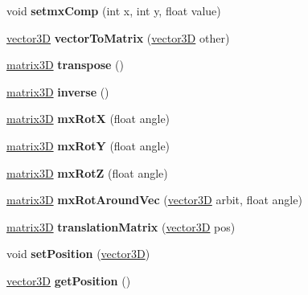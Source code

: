 \begin{DoxyCompactItemize}
\item 
\mbox{\label{classmatrix3_d_a90a56c9b54e69c6e6b14e5253e6fb507}} 
void {\bfseries setmx\+Comp} (int x, int y, float value)
\item 
\mbox{\label{classmatrix3_d_a24c14cd108fbee307eacc640d68af949}} 
\hyperlink{classvector3_d}{vector3D} {\bfseries vector\+To\+Matrix} (\hyperlink{classvector3_d}{vector3D} other)
\item 
\mbox{\label{classmatrix3_d_a3af04aa7b7595c94f41c6ecfb59c39c2}} 
\hyperlink{classmatrix3_d}{matrix3D} {\bfseries transpose} ()
\item 
\mbox{\label{classmatrix3_d_a375ff7e7c3504d98c6a6411744cf4aa1}} 
\hyperlink{classmatrix3_d}{matrix3D} {\bfseries inverse} ()
\item 
\mbox{\label{classmatrix3_d_ae0015f2654b0a8c44fe68c5464d8c8bb}} 
\hyperlink{classmatrix3_d}{matrix3D} {\bfseries mx\+RotX} (float angle)
\item 
\mbox{\label{classmatrix3_d_af59b5122e4f93a592a0a530186e067b0}} 
\hyperlink{classmatrix3_d}{matrix3D} {\bfseries mx\+RotY} (float angle)
\item 
\mbox{\label{classmatrix3_d_a16ad1167b5b54aa4c50b146b51141a28}} 
\hyperlink{classmatrix3_d}{matrix3D} {\bfseries mx\+RotZ} (float angle)
\item 
\mbox{\label{classmatrix3_d_a9dd591470d14ffb310134d24e782f36b}} 
\hyperlink{classmatrix3_d}{matrix3D} {\bfseries mx\+Rot\+Around\+Vec} (\hyperlink{classvector3_d}{vector3D} arbit, float angle)
\item 
\mbox{\label{classmatrix3_d_a91c593bb374ec57ac39352a7278893f2}} 
\hyperlink{classmatrix3_d}{matrix3D} {\bfseries translation\+Matrix} (\hyperlink{classvector3_d}{vector3D} pos)
\item 
\mbox{\label{classmatrix3_d_a2daa1bee597121dcff5b93e1e27cc31f}} 
void {\bfseries set\+Position} (\hyperlink{classvector3_d}{vector3D})
\item 
\mbox{\label{classmatrix3_d_acb8207a637c342d3a97f167e52696f1a}} 
\hyperlink{classvector3_d}{vector3D} {\bfseries get\+Position} ()
\end{DoxyCompactItemize}
